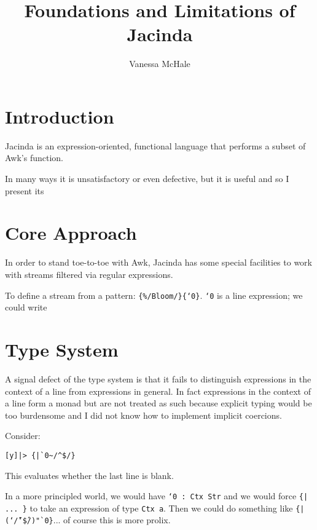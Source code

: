 \documentclass{report}
\begin{document}
\title{Foundations and Limitations of Jacinda}
\author {Vanessa McHale}
\maketitle

\tableofcontents

\section{Introduction}

Jacinda is an expression-oriented, functional language that performs a subset of Awk's function.

In many ways it is unsatisfactory or even defective, but it is useful and so I present its

\section{Core Approach}

In order to stand toe-to-toe with Awk, Jacinda has some special facilities to work with streams filtered via regular expressions.

To define a stream from a pattern: {\tt \{\%/Bloom/\}\{`0\}}. {\tt`0} is a line expression; we could write

\section{Type System}

A signal defect of the type system is that it fails to distinguish expressions in the context of a line from expressions in general. In fact expressions in the context of a line form a monad but are not treated as such because explicit typing would be too burdensome and I did not know how to implement implicit coercions.

Consider:

\begin{verbatim}
[y]|> {|`0~/^$/}
\end{verbatim}

This evaluates whether the last line is blank.

\newcommand\Tilde{\char`\~}
\newcommand\Caret{\char`\^}

In a more principled world, we would have {\tt `0 : Ctx Str} and we would force {\tt \{| ... \}} to take an expression of type {\tt Ctx a}. Then we could do something like {\tt \{|(\Tilde/\Caret\$/)"`0\}}... of course this is more prolix.
\end{document}
